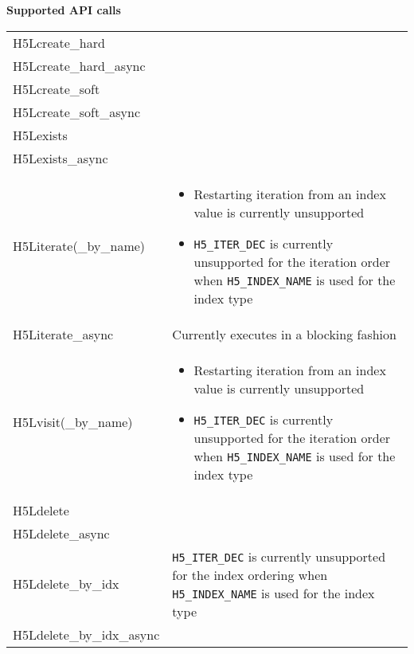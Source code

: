\documentclass[../users_guide.tex]{subfiles}
\begin{document}
\begin{center}

\textbf{Supported API calls}
\vspace{.2in} \\

\begin{tabularx}{\linewidth}{| X | >{\RaggedRight}X |}
\hline
\rowcolor{lightgray!50}%
\multicolumn{1}{| c |}{\textbf{API call}} & \multicolumn{1}{c |}{\textbf{Notes}} \\ \hline

H5Lcreate\_hard & \\ \hline
H5Lcreate\_hard\_async & \\ \hline
H5Lcreate\_soft & \\ \hline
H5Lcreate\_soft\_async & \\ \hline
H5Lexists & \\ \hline
H5Lexists\_async & \\ \hline

H5Literate(\_by\_name) & \begin{itemize}
                             \item Restarting iteration from an index value is currently unsupported\footnotemark[1]
                             \item \texttt{H5\_ITER\_DEC} is currently unsupported for the iteration order when \texttt{H5\_INDEX\_NAME} is used for the index type
                         \end{itemize}\\ \hline

H5Literate\_async & Currently executes in a blocking fashion\\ \hline
H5Lvisit(\_by\_name) & \begin{itemize}
                             \item Restarting iteration from an index value is currently unsupported\footnotemark[1]
                             \item \texttt{H5\_ITER\_DEC} is currently unsupported for the iteration order when \texttt{H5\_INDEX\_NAME} is used for the index type
                         \end{itemize}\\ \hline
H5Ldelete & \\ \hline
H5Ldelete\_async & \\ \hline
H5Ldelete\_by\_idx & \texttt{H5\_ITER\_DEC} is currently unsupported for the index ordering when \texttt{H5\_INDEX\_NAME} is used for the index type\\ \hline
H5Ldelete\_by\_idx\_async & \\ \hline


\end{tabularx}
\end{center}
\end{document}
